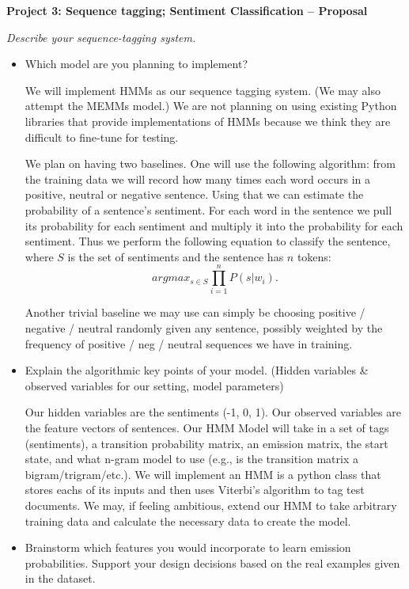 \documentclass{article}
\begin{document}
\begin{center}\textbf{Project 3: Sequence tagging; Sentiment Classification -- Proposal}\end{center}

\textit{Describe your sequence-tagging system.}\par
\begin{itemize}
\item Which model are you planning to implement?\par
We will implement HMMs as our sequence tagging system. (We may also attempt the MEMMs model.) We are not planning on using existing Python libraries that provide implementations of HMMs because we think they are difficult to fine-tune for testing.

We plan on having two baselines. One will use the following algorithm: from the training data we will record how many times each word occurs in a positive, neutral or negative sentence. Using that we can estimate the probability of a sentence's sentiment. For each word in the sentence we pull its probability for each sentiment and multiply it into the probability for each sentiment. Thus we perform the following equation to classify the sentence, where $S$ is the set of sentiments and the sentence has $n$ tokens:
\[argmax_{s \in S}{\prod_{i=1}^n} P(s|w_i).\]

Another trivial baseline we may use can simply be choosing positive / negative / neutral randomly given any sentence, possibly weighted by the frequency of positive / neg / neutral sequences we have in training.

\item Explain the algorithmic key points of your model. (Hidden variables \& observed variables for our setting, model parameters)\par

Our hidden variables are the sentiments (-1, 0, 1). Our observed variables are the feature vectors of sentences. Our HMM Model will take in a set of tags (sentiments), a transition probability matrix, an emission matrix, the start state, and what n-gram model to use (e.g., is the transition matrix a bigram/trigram/etc.). We will implement an HMM is a python class that stores eachs of its inputs and then uses Viterbi's algorithm to tag test documents. We may, if feeling ambitious, extend our HMM to take arbitrary training data and calculate the necessary data to create the model.

\item Brainstorm which features you would incorporate to learn emission probabilities. Support your design decisions based on the real examples given in the dataset.\par


\end{itemize}
\end{document}
